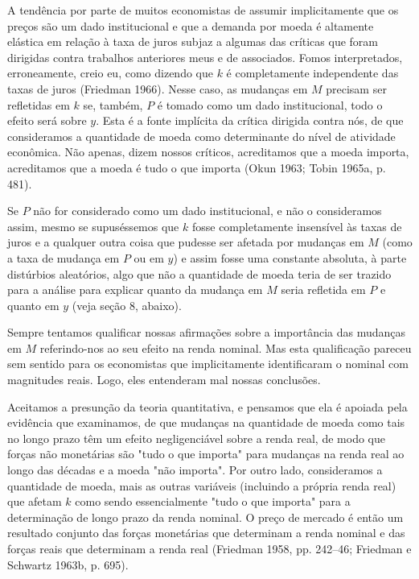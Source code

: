 \documentclass[12pt]{article}
\begin{document}
A tendência por parte de muitos economistas de assumir implicitamente que os preços são um dado institucional e que a demanda por moeda é altamente elástica em relação à taxa de juros subjaz a algumas das críticas que foram dirigidas contra trabalhos anteriores meus e de associados. Fomos interpretados, erroneamente, creio eu, como dizendo que $k$ é completamente independente das taxas de juros (Friedman 1966). Nesse caso, as mudanças em $M$ precisam ser refletidas em $k$ se, também, $P$ é tomado como um dado institucional, todo o efeito será sobre $y$. Esta é a fonte implícita da crítica dirigida contra nós, de que consideramos a quantidade de moeda como determinante do nível de atividade econômica. Não apenas, dizem nossos críticos, acreditamos que a moeda importa, acreditamos que a moeda é tudo o que importa (Okun 1963; Tobin 1965a, p. 481).

Se $P$ não for considerado como um dado institucional, e não o consideramos assim, mesmo se supuséssemos que $k$ fosse completamente insensível às taxas de juros e a qualquer outra coisa que pudesse ser afetada por mudanças em $M$ (como a taxa de mudança em $P$ ou em $y$) e assim fosse uma constante absoluta, à parte distúrbios aleatórios, algo que não a quantidade de moeda teria de ser trazido para a análise para explicar quanto da mudança em $M$ seria refletida em $P$ e quanto em $y$ (veja seção 8, abaixo).

Sempre tentamos qualificar nossas afirmações sobre a importância das mudanças em $M$ referindo-nos ao seu efeito na renda nominal. Mas esta qualificação pareceu sem sentido para os economistas que implicitamente identificaram o nominal com magnitudes reais. Logo, eles entenderam mal nossas conclusões.

Aceitamos a presunção da teoria quantitativa, e pensamos que ela é apoiada pela evidência que examinamos, de que mudanças na quantidade de moeda como tais no longo prazo têm um efeito negligenciável sobre a renda real, de modo que forças não monetárias são "tudo o que importa" para mudanças na renda real ao longo das décadas e a moeda "não importa". Por outro lado, consideramos a quantidade de moeda, mais as outras variáveis (incluindo a própria renda real) que afetam $k$ como sendo essencialmente "tudo o que importa" para a determinação de longo prazo da renda nominal. O preço de mercado é então um resultado conjunto das forças monetárias que determinam a renda nominal e das forças reais que determinam a renda real (Friedman 1958, pp. 242–46; Friedman e Schwartz 1963b, p. 695).
\end{document}
